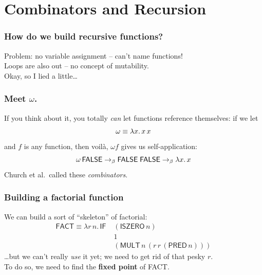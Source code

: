 \documentclass{beamer}
\newcommand{\lf}[2]{\lambda{#1}.\,{#2}}
\newcommand{\bto}{\to_{\beta}}
\newcommand{\FALSE}{\textsf{FALSE}}
\newcommand{\IF}{\textsf{IF}}
\newcommand{\MULT}{\textsf{MULT}}
\newcommand{\ISZERO}{\textsf{ISZERO}}
\newcommand{\PRED}{\textsf{PRED}}
\newcommand{\FACT}{\textsf{FACT}}
\begin{document}
    \section{Combinators and Recursion}

    \begin{frame}
        \frametitle{How do we build recursive functions?}
        Problem: no variable assignment -- can't name functions! \\[2em]
        \pause
        Loops are also out -- no concept of mutability. \\[2em]
        \pause
        Okay, so I lied a little\ldots
    \end{frame}

    \begin{frame}
        \frametitle{Meet $\omega$.}
        If you think about it, you totally \emph{can} let functions reference themselves: if we let \\
        \[
            \omega \equiv \lf{x}{x \, x}
            \vspace{1em}
        \]
        and $f$ is any function, then voil\`{a}, $\omega f$ gives us self-application: \\[0.5em]
        \pause
        \[
            \omega \, \FALSE \bto \FALSE \; \FALSE \bto \lf{x}{x}
            \vspace{1em}
        \]
        \pause
        Church et al.\ called these \emph{combinators}.
    \end{frame}

    \begin{frame}
        \frametitle{Building a factorial function}
        We can build a sort of ``skeleton'' of factorial:
        \begin{align*}
            \FACT \equiv \lf{r\,n}{\IF} \;  & (\ISZERO \, n) \\
                                            & 1 \\
                                            & (\MULT \, n \, (r \, r \, (\PRED \, n)))
        \end{align*}
        \pause
        \ldots{}but we can't really \emph{use} it yet; we need to get rid of that pesky $r$. \\[1em]
        \pause
        To do so, we need to find the \textbf{fixed point} of FACT.
    \end{frame}
\end{document}
